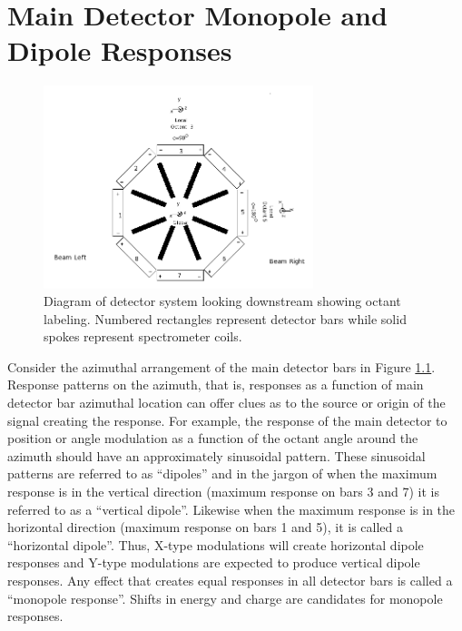 
\chapter{Main Detector Monopole and Dipole Responses} 
\captionsetup{justification=justified,singlelinecheck=false}

\label{AppendixD} 


\begin{figure}[ht]
\centering
\includegraphics[width=0.7\textwidth]{Pictures/octant_coordinates.png}
\caption{Diagram of \Qs detector system looking downstream showing octant labeling. Numbered rectangles represent detector bars while solid spokes represent spectrometer coils.}
\label{fig:octant_coords_D}
\end{figure}
Consider the azimuthal arrangement of the main detector bars in Figure \ref{fig:octant_coords_D}. Response patterns on the azimuth, that is, responses as a function of main detector bar azimuthal location can offer clues as to the source or origin of the signal creating the response. For example, the response of the main detector to position or angle modulation as a function of the octant angle around the azimuth should have an approximately sinusoidal pattern. These sinusoidal patterns are referred to as ``dipoles'' and in the jargon of \Qs when the maximum response is in the vertical direction (maximum response on bars 3 and 7) it is referred to  as a ``vertical dipole''. Likewise when the maximum response is in the horizontal direction (maximum response on bars 1 and 5), it is called a ``horizontal dipole''. Thus, X-type modulations will create horizontal dipole responses and Y-type modulations are expected to produce vertical dipole responses. Any effect that creates equal responses in all detector bars is called a ``monopole response''. Shifts in energy and charge are candidates for monopole responses.

